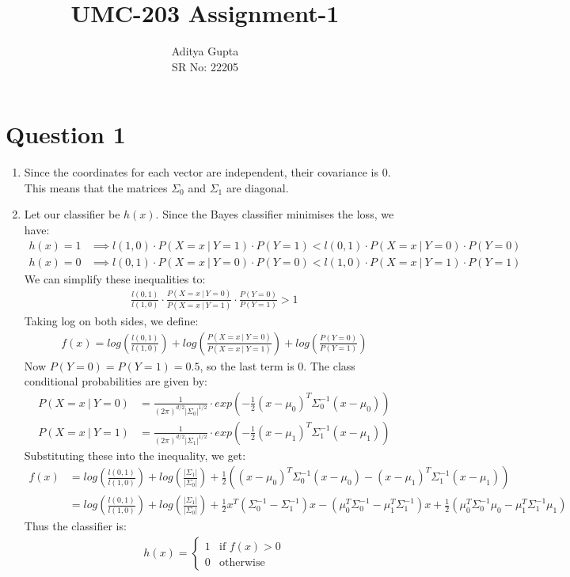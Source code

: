 \documentclass[12pt]{article}
\title{\vspace{-1.5cm}UMC-203 Assignment-1}
\author{Aditya Gupta \\
SR No: 22205}
\date{}
\begin{document}
\maketitle

\section*{Question 1}
\begin{enumerate}[leftmargin=*]
    \item Since the coordinates for each vector are independent, their covariance is 0. This means that the matrices $\Sigma_0$ and $\Sigma_1$ are diagonal.
    
    \medskip
    \item Let our classifier be $h(x)$. Since the Bayes classifier minimises the loss, we have:
    \begin{align*}
        h(x) = 1 &\implies l(1,0) \cdot P(X=x \ | \ Y=1) \cdot P(Y=1) < l(0,1) \cdot P(X=x \ | \ Y=0) \cdot P(Y=0) \\
        h(x) = 0 &\implies l(0,1) \cdot P(X=x \ | \ Y=0) \cdot P(Y=0) < l(1,0) \cdot P(X=x \ | \ Y=1) \cdot P(Y=1)
    \end{align*}
    We can simplify these inequalities to:
    \begin{align*}
        \frac{l(0,1)}{l(1,0)} \cdot \frac{P(X=x \ | \ Y=0)}{P(X=x \ | \ Y=1)} \cdot \frac{P(Y=0)}{P(Y=1)} > 1
    \end{align*}
    Taking log on both sides, we define:
    \begin{align*}
        f(x) = log(\frac{l(0,1)}{l(1,0)}) + log(\frac{P(X=x \ | \ Y=0)}{P(X=x \ | \ Y=1)}) + log(\frac{P(Y=0)}{P(Y=1)})
    \end{align*}
    Now $P(Y=0) = P(Y=1) = 0.5$, so the last term is 0. The class conditional probabilities are given by:
    \begin{align*}
        P(X=x \ | \ Y=0) &= \frac{1}{(2\pi)^{d/2}|\Sigma_0|^{1/2}} \cdot exp(-\frac{1}{2}(x-\mu_0)^T\Sigma_0^{-1}(x-\mu_0)) \\
        P(X=x \ | \ Y=1) &= \frac{1}{(2\pi)^{d/2}|\Sigma_1|^{1/2}} \cdot exp(-\frac{1}{2}(x-\mu_1)^T\Sigma_1^{-1}(x-\mu_1))
    \end{align*}
    Substituting these into the inequality, we get:
    \begin{align*}
        f(x) &= log(\frac{l(0,1)}{l(1,0)}) + log(\frac{|\Sigma_1|}{|\Sigma_0|}) + \frac{1}{2}((x-\mu_0)^T\Sigma_0^{-1}(x-\mu_0) - (x-\mu_1)^T\Sigma_1^{-1}(x-\mu_1)) \\
        &= log(\frac{l(0,1)}{l(1,0)}) + log(\frac{|\Sigma_1|}{|\Sigma_0|}) + \frac{1}{2}x^T(\Sigma_0^{-1}-\Sigma_1^{-1})x - (\mu_0^T\Sigma_0^{-1}-\mu_1^T\Sigma_1^{-1})x + \frac{1}{2}(\mu_0^T\Sigma_0^{-1}\mu_0 - \mu_1^T\Sigma_1^{-1}\mu_1)
    \end{align*}
    Thus the classifier is:
    \begin{align*}
        h(x) = \begin{cases}
            1 & \text{if } f(x) > 0 \\
            0 & \text{otherwise}
        \end{cases}
    \end{align*}


\end{enumerate}
\end{document}
